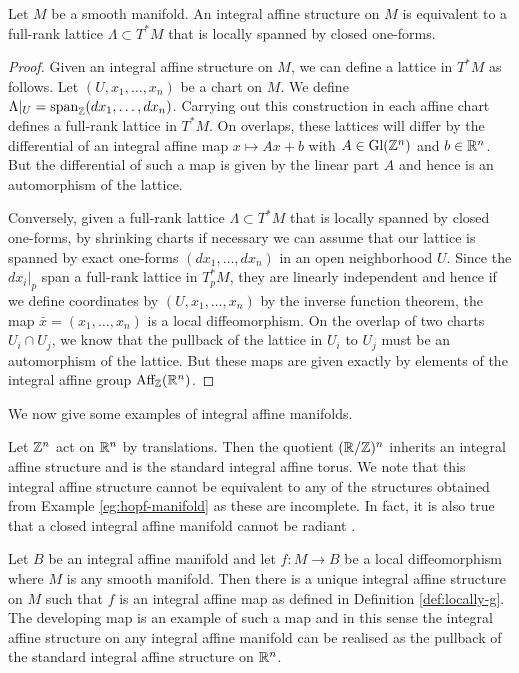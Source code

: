 \begin{prop}\label{prop:integral-affine-equiv-lattice}
    Let $M$ be a smooth manifold. An integral affine structure on $M$ is equivalent to a full-rank lattice
    $\Lambda \subset T^*M$ that is locally spanned by closed one-forms.
\end{prop}
\begin{proof}
    Given an integral affine structure on $M$, we can define a lattice in $T^*M$ as follows. Let $(U, x_1, \dots ,x_n)$ be a chart on $M$. We define
    $\Lambda|_U = \text{span}_{\mathbb{Z}}(dx_1, \dots, dx_n)$. Carrying out this construction in each affine chart defines a full-rank lattice in $T^*M$. On overlaps, these lattices
    will differ by the differential of an integral affine map $x \mapsto Ax + b$ with $A \in \text{Gl}(\mathbb{Z}^n)$ and $b \in \mathbb{R}^n$. But the differential of such a map is given by the linear part $A$ and hence is an automorphism of the lattice.

    Conversely, given a full-rank lattice $\Lambda \subset T^*M$ that is locally
    spanned by closed one-forms, by shrinking charts if necessary we can assume
    that our lattice is spanned by exact one-forms $(dx_1, \dots , dx_n)$ in an
    open neighborhood $U$. Since the $dx_i|_p$ span a full-rank lattice in
    $T_p^*M$, they are linearly independent and hence if we define coordinates by
    $(U, x_1 ,\dots , x_n)$ by the inverse function theorem, the map $\bar{x} =
        (x_1, \dots ,x_n)$ is a local diffeomorphism. On the overlap of two charts $U_i
        \cap U_j$, we know that the pullback of the lattice in $U_i$ to $U_j$ must be
    an automorphism of the lattice. But these maps are given exactly by elements of
    the integral affine group $\text{Aff}_{\mathbb{Z}}(\mathbb{R}^n)$.
\end{proof}

We now give some examples of integral affine manifolds.
\begin{eg}
    Let $\mathbb{Z}^n$ act on $\mathbb{R}^n$ by translations. Then the quotient $(\mathbb{R}/\mathbb{Z})^n$ inherits an integral affine structure and is the standard integral affine torus. We note that
    this integral affine structure cannot be equivalent to any of the structures obtained from Example \ref{eg:hopf-manifold} as these are incomplete. In fact, it is also true that
    a closed integral affine manifold cannot be radiant \cite{nilpotent-holonomy}.
\end{eg}

\begin{eg}
    Let $B$ be an integral affine manifold and let $f: M \to B$ be a local diffeomorphism where $M$ is any smooth manifold. Then there is a unique integral affine structure on $M$ such that $f$ is
    an integral affine map as defined in Definition \ref{def:locally-g}. The developing map is an example of such a map and in this sense the integral affine structure on any integral affine manifold
    can be realised as the pullback of the standard integral affine structure on $\mathbb{R}^n$.
\end{eg}

